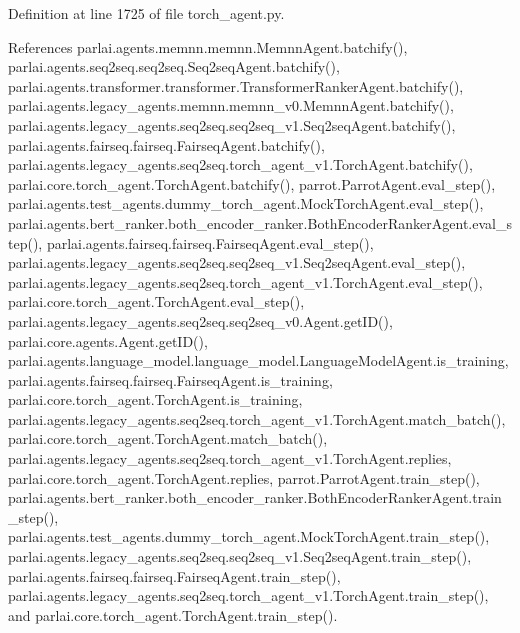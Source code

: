 Definition at line 1725 of file torch\+\_\+agent.\+py.



References parlai.\+agents.\+memnn.\+memnn.\+Memnn\+Agent.\+batchify(), parlai.\+agents.\+seq2seq.\+seq2seq.\+Seq2seq\+Agent.\+batchify(), parlai.\+agents.\+transformer.\+transformer.\+Transformer\+Ranker\+Agent.\+batchify(), parlai.\+agents.\+legacy\+\_\+agents.\+memnn.\+memnn\+\_\+v0.\+Memnn\+Agent.\+batchify(), parlai.\+agents.\+legacy\+\_\+agents.\+seq2seq.\+seq2seq\+\_\+v1.\+Seq2seq\+Agent.\+batchify(), parlai.\+agents.\+fairseq.\+fairseq.\+Fairseq\+Agent.\+batchify(), parlai.\+agents.\+legacy\+\_\+agents.\+seq2seq.\+torch\+\_\+agent\+\_\+v1.\+Torch\+Agent.\+batchify(), parlai.\+core.\+torch\+\_\+agent.\+Torch\+Agent.\+batchify(), parrot.\+Parrot\+Agent.\+eval\+\_\+step(), parlai.\+agents.\+test\+\_\+agents.\+dummy\+\_\+torch\+\_\+agent.\+Mock\+Torch\+Agent.\+eval\+\_\+step(), parlai.\+agents.\+bert\+\_\+ranker.\+both\+\_\+encoder\+\_\+ranker.\+Both\+Encoder\+Ranker\+Agent.\+eval\+\_\+step(), parlai.\+agents.\+fairseq.\+fairseq.\+Fairseq\+Agent.\+eval\+\_\+step(), parlai.\+agents.\+legacy\+\_\+agents.\+seq2seq.\+seq2seq\+\_\+v1.\+Seq2seq\+Agent.\+eval\+\_\+step(), parlai.\+agents.\+legacy\+\_\+agents.\+seq2seq.\+torch\+\_\+agent\+\_\+v1.\+Torch\+Agent.\+eval\+\_\+step(), parlai.\+core.\+torch\+\_\+agent.\+Torch\+Agent.\+eval\+\_\+step(), parlai.\+agents.\+legacy\+\_\+agents.\+seq2seq.\+seq2seq\+\_\+v0.\+Agent.\+get\+I\+D(), parlai.\+core.\+agents.\+Agent.\+get\+I\+D(), parlai.\+agents.\+language\+\_\+model.\+language\+\_\+model.\+Language\+Model\+Agent.\+is\+\_\+training, parlai.\+agents.\+fairseq.\+fairseq.\+Fairseq\+Agent.\+is\+\_\+training, parlai.\+core.\+torch\+\_\+agent.\+Torch\+Agent.\+is\+\_\+training, parlai.\+agents.\+legacy\+\_\+agents.\+seq2seq.\+torch\+\_\+agent\+\_\+v1.\+Torch\+Agent.\+match\+\_\+batch(), parlai.\+core.\+torch\+\_\+agent.\+Torch\+Agent.\+match\+\_\+batch(), parlai.\+agents.\+legacy\+\_\+agents.\+seq2seq.\+torch\+\_\+agent\+\_\+v1.\+Torch\+Agent.\+replies, parlai.\+core.\+torch\+\_\+agent.\+Torch\+Agent.\+replies, parrot.\+Parrot\+Agent.\+train\+\_\+step(), parlai.\+agents.\+bert\+\_\+ranker.\+both\+\_\+encoder\+\_\+ranker.\+Both\+Encoder\+Ranker\+Agent.\+train\+\_\+step(), parlai.\+agents.\+test\+\_\+agents.\+dummy\+\_\+torch\+\_\+agent.\+Mock\+Torch\+Agent.\+train\+\_\+step(), parlai.\+agents.\+legacy\+\_\+agents.\+seq2seq.\+seq2seq\+\_\+v1.\+Seq2seq\+Agent.\+train\+\_\+step(), parlai.\+agents.\+fairseq.\+fairseq.\+Fairseq\+Agent.\+train\+\_\+step(), parlai.\+agents.\+legacy\+\_\+agents.\+seq2seq.\+torch\+\_\+agent\+\_\+v1.\+Torch\+Agent.\+train\+\_\+step(), and parlai.\+core.\+torch\+\_\+agent.\+Torch\+Agent.\+train\+\_\+step().



